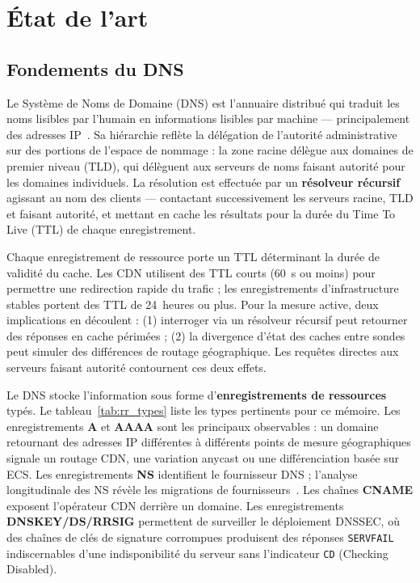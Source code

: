
\chapter{État de l'art}

\section{Fondements du DNS}
\label{sec:2.1}

Le Système de Noms de Domaine (DNS) est l'annuaire distribué qui traduit les noms lisibles par l'humain en informations lisibles par machine --- principalement des adresses IP~\cite{RFC1034,RFC1035}. Sa hiérarchie reflète la délégation de l'autorité administrative sur des portions de l'espace de nommage : la zone racine délègue aux domaines de premier niveau (TLD), qui délèguent aux serveurs de noms faisant autorité pour les domaines individuels. La résolution est effectuée par un \textbf{résolveur récursif} agissant au nom des clients --- contactant successivement les serveurs racine, TLD et faisant autorité, et mettant en cache les résultats pour la durée du Time To Live (TTL) de chaque enregistrement.

Chaque enregistrement de ressource porte un TTL déterminant la durée de validité du cache. Les CDN utilisent des TTL courts (60~s ou moins) pour permettre une redirection rapide du trafic ; les enregistrements d'infrastructure stables portent des TTL de 24~heures ou plus. Pour la mesure active, deux implications en découlent : (1) interroger via un résolveur récursif peut retourner des réponses en cache périmées ; (2) la divergence d'état des caches entre sondes peut simuler des différences de routage géographique. Les requêtes directes aux serveurs faisant autorité contournent ces deux effets.

Le DNS stocke l'information sous forme d'\textbf{enregistrements de ressources} typés. Le tableau~\ref{tab:rr_types} liste les types pertinents pour ce mémoire. Les enregistrements \textbf{A} et \textbf{AAAA} sont les principaux observables : un domaine retournant des adresses IP différentes à différents points de mesure géographiques signale un routage CDN, une variation anycast ou une différenciation basée sur ECS. Les enregistrements \textbf{NS} identifient le fournisseur DNS ; l'analyse longitudinale des NS révèle les migrations de fournisseurs~\cite{vanRijswijk2016}. Les chaînes \textbf{CNAME} exposent l'opérateur CDN derrière un domaine. Les enregistrements \textbf{DNSKEY/DS/RRSIG} permettent de surveiller le déploiement DNSSEC, où des chaînes de clés de signature corrompues produisent des réponses \texttt{SERVFAIL} indiscernables d'une indisponibilité du serveur sans l'indicateur \texttt{CD} (Checking Disabled).


